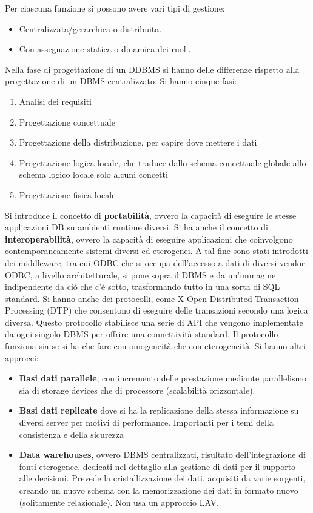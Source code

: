 Per ciascuna funzione si possono avere vari tipi di gestione:
\begin{itemize}
      \item Centralizzata/gerarchica o distribuita.
      \item Con assegnazione statica o dinamica dei ruoli.
\end{itemize}
Nella fase di progettazione di un DDBMS si hanno delle differenze rispetto alla
progettazione di un DBMS centralizzato. Si hanno cinque fasi:
\begin{enumerate}
      \item Analisi dei requisiti
      \item Progettazione concettuale
      \item Progettazione della distribuzione, per capire dove mettere i dati
      \item Progettazione logica locale, che traduce dallo schema concettuale
            globale allo schema logico locale solo alcuni concetti
      \item Progettazione fisica locale
\end{enumerate}
Si introduce il concetto di \textbf{portabilità}, ovvero la capacità di eseguire
le stesse applicazioni DB su ambienti runtime diversi. Si ha anche il concetto
di \textbf{interoperabilità}, ovvero la capacità di eseguire applicazioni che
coinvolgono contemporaneamente sistemi diversi ed eterogenei. A tal fine sono
stati introdotti dei middleware, tra cui ODBC che si occupa dell'accesso a dati
di diversi vendor. ODBC, a livello architetturale, si pone sopra il DBMS e da
un'immagine indipendente da ciò che c'è sotto, trasformando tutto in una sorta
di SQL standard. Si hanno anche dei protocolli, come X-Open Distributed
Transaction Processing (DTP) che consentono di eseguire delle transazioni secondo
una logica diversa. Questo protocollo stabilisce una serie di API che vengono
implementate da ogni singolo DBMS per offrire una connettività standard.
Il protocollo funziona sia se si ha che fare con omogeneità che con eterogeneità.
Si hanno altri approcci:
\begin{itemize}
      \item \textbf{Basi dati parallele}, con incremento delle prestazione
            mediante parallelismo sia di storage devices che di processore
            (scalabilità orizzontale).
      \item \textbf{Basi dati replicate} dove si ha la replicazione della stessa
            informazione su diversi server per motivi di performance. Importanti
            per i temi della consistenza e della sicurezza
      \item \textbf{Data warehouses}, ovvero DBMS centralizzati, risultato
            dell'integrazione di fonti eterogenee, dedicati nel dettaglio alla
            gestione di dati per il supporto alle decisioni. Prevede la
            cristallizzazione dei dati, acquisiti da varie sorgenti, creando un
            nuovo schema con la memorizzazione dei dati in formato nuovo
            (solitamente relazionale). Non usa un approccio LAV.
\end{itemize}
